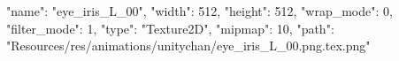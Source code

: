 {
  "name": "eye_iris_L_00",
  "width": 512,
  "height": 512,
  "wrap_mode": 0,
  "filter_mode": 1,
  "type": "Texture2D",
  "mipmap": 10,
  "path": "Resources/res/animations/unitychan/eye_iris_L_00.png.tex.png"
}